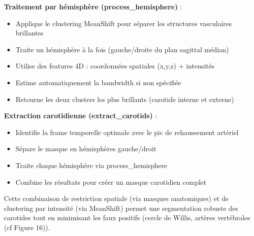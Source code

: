 \documentclass[a4paper]{article}
\begin{document}
                \textbf{Traitement par hémisphère (process\_hemisphere)} :
                \begin{itemize}
                    \item Applique le clustering MeanShift pour séparer les structures vasculaires brillantes
                    \item Traite un hémisphère à la fois (gauche/droite du plan sagittal médian)
                    \item Utilise des features 4D : coordonnées spatiales (x,y,z) + intensités
                    \item Estime automatiquement la bandwidth si non spécifiée
                    \item Retourne les deux clusters les plus brillants (carotide interne et externe)
                \end{itemize}
                
                \vspace{1em} 
                \hspace{0em}\textbf{Extraction carotidienne (extract\_carotids)} :
                \begin{itemize}
                    \item Identifie la frame temporelle optimale avec le pic de rehaussement artériel
                    \item Sépare le masque en hémisphères gauche/droit
                    \item Traite chaque hémisphère via process\_hemisphere
                    \item Combine les résultats pour créer un masque carotidien complet
                \end{itemize}

            Cette combinaison de restriction spatiale (via masques anatomiques) et de clustering par intensité (via MeanShift) permet une segmentation robuste des carotides tout en minimisant les faux positifs (cercle de Willis, artères vertébrales (cf Figure 16)).\\
            
        \noindent
\end{document}
